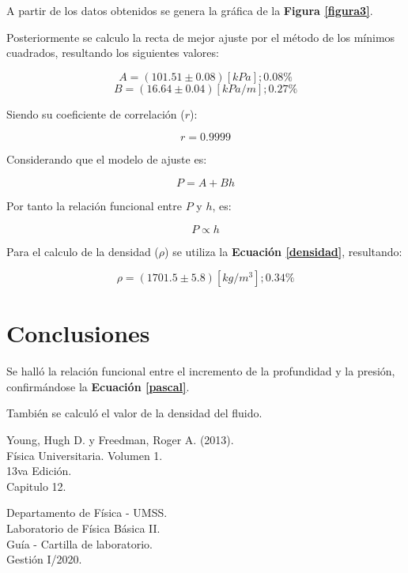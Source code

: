 \documentclass[letter,11pt]{article}
\begin{document}
A partir de los datos obtenidos se genera la gráfica de la
\textbf{Figura \ref{figura3}}.

Posteriormente se calculo la recta de mejor ajuste por el método de los mínimos
cuadrados, resultando los siguientes valores:

\begin{equation*}
    A = (101.51 \pm 0.08) [kPa]; 0.08\%
\end{equation*}
\begin{equation*}
    B = (16.64 \pm 0.04) [kPa/m]; 0.27\%
\end{equation*}
\vspace{0.10cm}

Siendo su coeficiente de correlación ($r$):

\begin{equation*}
    r = 0.9999
\end{equation*}
\vspace{0.10cm}

Considerando que el modelo de ajuste es:

\begin{equation*}
    P = A + B h
\end{equation*}
\vspace{0.10cm}

Por tanto la relación funcional entre $P$ y $h$, es:

\begin{equation*}
    P \propto h
\end{equation*}
\vspace{0.10cm}

Para el calculo de la densidad ($\rho$) se utiliza la
\textbf{Ecuación \ref{densidad}}, resultando:

\begin{equation*}
    \rho = (1701.5 \pm 5.8) [kg/m^3]; 0.34\%
\end{equation*}
\vspace{0.10cm}

\section{Conclusiones}

Se halló la relación funcional entre el incremento de la profundidad y
la presión, confirmándose la \textbf{Ecuación \ref{pascal}}.

También se calculó el valor de la densidad del fluido.

\begin{thebibliography}{99}

 Young, Hugh D. y Freedman, Roger A. (2013).\\
Física Universitaria. Volumen 1.\\
13va Edición.\\
Capitulo 12.

 Departamento de Física - UMSS.\\
Laboratorio de Física Básica II.\\
Guía - Cartilla de laboratorio.\\
Gestión I/2020.

\end{thebibliography}
\end{document}

